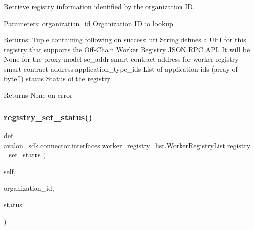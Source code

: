 \begin{DoxyVerb}Retrieve registry information identified by the organization ID.

Parameters:
organization_id      Organization ID to lookup

Returns:
Tuple containing following on success:
uri                  String defines a URI for this registry that
             supports the Off-Chain Worker Registry JSON RPC
             API. It will be None for the proxy model
sc_addr              smart contract address for worker registry
             smart contract address
application_type_ids List of application ids (array of byte[])
status               Status of the registry

Returns None on error.
\end{DoxyVerb}
 \mbox{\label{classavalon__sdk_1_1connector_1_1interfaces_1_1worker__registry__list_1_1WorkerRegistryList_a9b824d1006e63cbdb74fc4dd99b65c63}} 
\subsubsection{\texorpdfstring{registry\+\_\+set\+\_\+status()}{registry\_set\_status()}}
{\footnotesize\ttfamily def avalon\+\_\+sdk.\+connector.\+interfaces.\+worker\+\_\+registry\+\_\+list.\+Worker\+Registry\+List.\+registry\+\_\+set\+\_\+status (\begin{DoxyParamCaption}\item[{}]{self,  }\item[{}]{organization\+\_\+id,  }\item[{}]{status }\end{DoxyParamCaption})}

